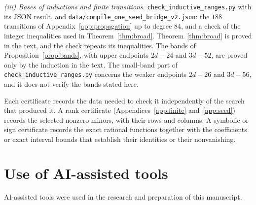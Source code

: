 \documentclass{amsart}
\newcommand{\file}[1]{\nolinkurl{#1}}
\theoremstyle{definition}
\theoremstyle{remark}
\numberwithin{equation}{section}
\begin{document}
\emph{(iii) Bases of inductions and finite transitions.}
\file{check_inductive_ranges.py} with its JSON result, and
\file{data/compile_one_seed_bridge_v2.json}: the $188$ transitions of
Appendix~\ref{app:propagation} up to degree $84$, and a check of the integer inequalities
used in Theorem~\ref{thm:broad}. Theorem~\ref{thm:broad} is proved in the text, and the
check repeats its inequalities. The bands of Proposition~\ref{prop:bands}, with upper
endpoints $2d-24$ and $3d-52$, are proved only by the induction in the text. The
small-band part of \file{check_inductive_ranges.py} concerns the weaker endpoints $2d-26$
and $3d-56$, and it does not verify the bands stated here.

Each certificate records the data needed to check it independently of the search that
produced it. A rank certificate (Appendices~\ref{app:finite} and~\ref{app:seed}) records
the selected nonzero minors, with their rows and columns. A symbolic or sign certificate
records the exact rational functions together with the coefficients or exact interval
bounds that establish their identities or their nonvanishing.

\section*{Use of AI-assisted tools}
AI-assisted tools were used in the research and preparation of this manuscript.
\end{document}
